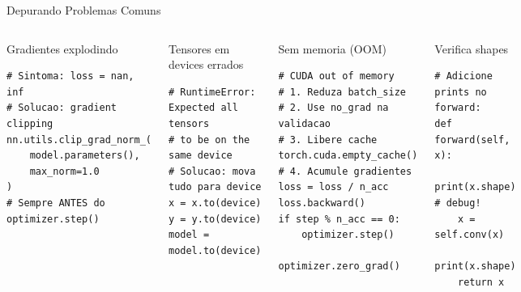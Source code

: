 \documentclass[aspectratio=169, 10pt]{beamer}
\begin{document}
\begin{frame}[fragile]{Depurando Problemas Comuns}
\begin{columns}
\begin{alertblock}{Gradientes explodindo}
\begin{lstlisting}[numbers=none]
# Sintoma: loss = nan, inf
# Solucao: gradient clipping
nn.utils.clip_grad_norm_(
    model.parameters(),
    max_norm=1.0
)
# Sempre ANTES do optimizer.step()
\end{lstlisting}
\end{alertblock}

\begin{alertblock}{Tensores em devices errados}
\begin{lstlisting}[numbers=none]
# RuntimeError: Expected all tensors
# to be on the same device
# Solucao: mova tudo para device
x = x.to(device)
y = y.to(device)
model = model.to(device)
\end{lstlisting}
\end{alertblock}

\begin{alertblock}{Sem memoria (OOM)}
\begin{lstlisting}[numbers=none]
# CUDA out of memory
# 1. Reduza batch_size
# 2. Use no_grad na validacao
# 3. Libere cache
torch.cuda.empty_cache()
# 4. Acumule gradientes
loss = loss / n_acc
loss.backward()
if step % n_acc == 0:
    optimizer.step()
    optimizer.zero_grad()
\end{lstlisting}
\end{alertblock}

\begin{exampleblock}{Verifica shapes}
\begin{lstlisting}[numbers=none]
# Adicione prints no forward:
def forward(self, x):
    print(x.shape)   # debug!
    x = self.conv(x)
    print(x.shape)
    return x
\end{lstlisting}
\end{exampleblock}
\end{columns}
\end{frame}

\end{document}
